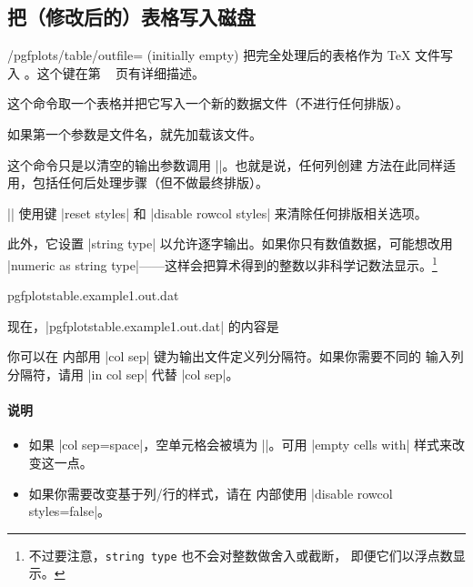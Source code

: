 \documentclass[a4paper,doc2]{ltxdoc}
\begin{document}
\subsection{把（修改后的）表格写入磁盘}

\begin{key}{/pgfplots/table/outfile= (initially empty)}
    把完全处理后的表格作为 \TeX{} 文件写入 。这个键在第
    ~\pageref{page:outfile} 页有详细描述。
\end{key}

\begin{command}{\pgfplotstablesave{}}
    这个命令取一个表格并把它写入一个新的数据文件（不进行任何排版）。

    如果第一个参数是文件名，就先加载该文件。

    这个命令只是以清空的输出参数调用 |\pgfplotstabletypeset|。也就是说，任何列创建
    方法在此同样适用，包括任何后处理步骤（但不做最终排版）。

    |\pgfplotstablesave| 使用键 |reset styles| 和 |disable rowcol styles|
    来清除任何排版相关选项。

    此外，它设置 |string type| 以允许逐字输出。如果你只有数值数据，可能想改用
    |numeric as string type|——这样会把算术得到的整数以非科学记数法显示。\footnote{不过要注意，\texttt{string type} 也不会对整数做舍入或截断，
    即便它们以浮点数显示。}
\begin{codeexample}[]
    {pgfplotstable.example1.out.dat}
\end{codeexample}
    现在，|pgfplotstable.example1.out.dat| 的内容是
    

    你可以在  内部用 |col sep| 键为输出文件定义列分隔符。如果你需要不同的
    输入列分隔符，请用 |in col sep| 代替 |col sep|。


    \paragraph{说明}

    \begin{itemize}
        \item 如果 |col sep=space|，空单元格会被填为 |{}|。可用 |empty cells with|
            样式来改变这一点。
        \item 如果你需要改变基于列/行的样式，请在  内部使用
            |disable rowcol styles=false|。
    \end{itemize}
\end{command}
\end{document}
